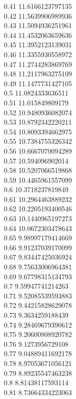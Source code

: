 {0.41	11.6166123797135\\
0.42	11.5639906989936\\
0.43	11.5094936251961\\
0.44	11.4532063659636\\
0.45	11.3952123139031\\
0.46	11.3355930558972\\
0.47	11.2744283869769\\
0.48	11.2117963275109\\
0.49	11.1477731427105\\
0.5	11.0824333636511\\
0.51	11.015849809179\\
0.52	10.9480936082074\\
0.53	10.8792342220211\\
0.54	10.8093394662975\\
0.55	10.7384755326342\\
0.56	10.6667070094289\\
0.57	10.594096902014\\
0.58	10.5207066519868\\
0.59	10.4465961557099\\
0.6	10.3718237819849\\
0.61	10.2964463889232\\
0.62	10.2205193400546\\
0.63	10.1440965197273\\
0.64	10.0672303478643\\
0.65	9.98997179414669\\
0.66	9.91237039170099\\
0.67	9.83447425036924\\
0.68	9.75633006964381\\
0.69	9.67798315134793\\
0.7	9.59947741214263\\
0.71	9.52085539593883\\
0.72	9.44215828629078\\
0.73	9.3634259188439\\
0.74	9.28469679390612\\
0.75	9.20600808920782\\
0.76	9.1273956729108\\
0.77	9.04889411692178\\
0.78	8.97053671056121\\
0.79	8.89235547463238\\
0.8	8.81438117593114\\
0.81	8.73664334223063\\
}
